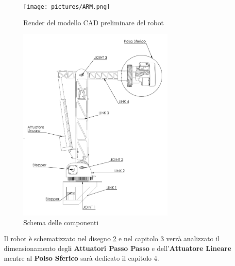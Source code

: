\documentclass[%
corpo=11pt,
twoside,
 stile=classica,
oldstyle,
greek,%
]{toptesi}
\begin{document}
	\begin{figure}
	\centering
	\texttt{[image: pictures/ARM.png]}
	\caption{Render del modello CAD preliminare del robot}
	\label{fig:render}
\end{figure}
	\begin{figure}
	\centering
	\includegraphics[width=0.7\textwidth]{Screen/ARMBollato.png}
	\caption{Schema delle componenti}
	\label{fig:bollatura}
\end{figure}
Il robot è schematizzato nel disegno \ref{fig:bollatura} e nel capitolo 3 verrà analizzato il dimensionamento degli  \textbf{Attuatori Passo Passo} e dell'\textbf{Attuatore Lineare} mentre al \textbf{Polso Sferico} sarà dedicato il capitolo 4. 

	
\end{document}
